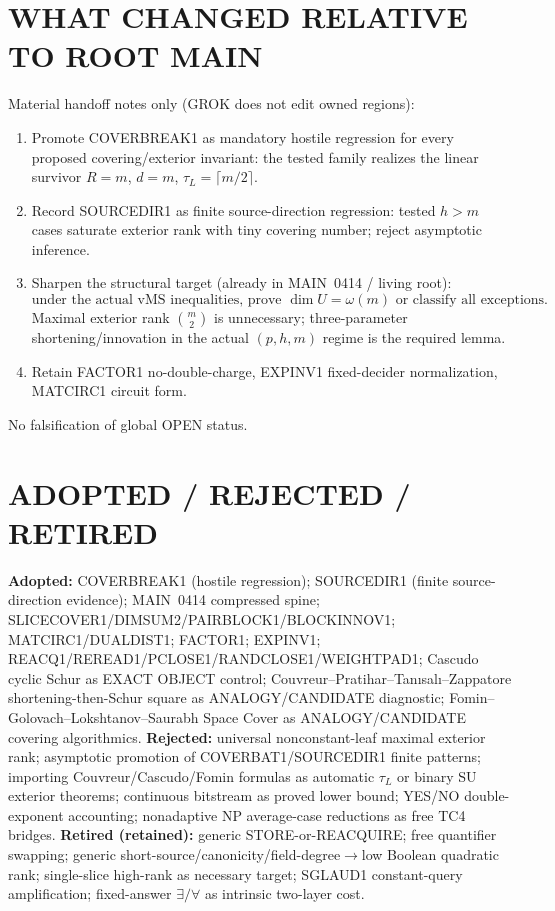 \documentclass[11pt]{article}
\begin{document}
\section*{WHAT CHANGED RELATIVE TO ROOT MAIN}
Material handoff notes only (GROK does not edit owned regions):
\begin{enumerate}
\item Promote COVERBREAK1 as mandatory hostile regression for every proposed covering/exterior
invariant: the tested family realizes the linear survivor $R=m$, $d=m$, $\tau_L=\lceil m/2\rceil$.
\item Record SOURCEDIR1 as finite source-direction regression: tested $h>m$ cases saturate
exterior rank with tiny covering number; reject asymptotic inference.
\item Sharpen the structural target (already in MAIN~0414 / living root):
\[
\boxed{\text{under the actual vMS inequalities, prove }\dim U=\omega(m)\text{ or classify all exceptions}.}
\]
Maximal exterior rank $\binom{m}{2}$ is unnecessary; three-parameter shortening/innovation in the
actual $(p,h,m)$ regime is the required lemma.
\item Retain FACTOR1 no-double-charge, EXPINV1 fixed-decider normalization, MATCIRC1 circuit form.
\end{enumerate}
No falsification of global OPEN status.

\section*{ADOPTED / REJECTED / RETIRED}
\textbf{Adopted:} COVERBREAK1 (hostile regression); SOURCEDIR1 (finite source-direction evidence);
MAIN~0414 compressed spine; SLICECOVER1/DIMSUM2/PAIRBLOCK1/BLOCKINNOV1; MATCIRC1/DUALDIST1;
FACTOR1; EXPINV1; REACQ1/REREAD1/PCLOSE1/RANDCLOSE1/WEIGHTPAD1; Cascudo cyclic Schur as EXACT
OBJECT control; Couvreur--Pratihar--Tan{\i}sal{\i}--Zappatore shortening-then-Schur square as
ANALOGY/CANDIDATE diagnostic; Fomin--Golovach--Lokshtanov--Saurabh Space Cover as
ANALOGY/CANDIDATE covering algorithmics.
\textbf{Rejected:} universal nonconstant-leaf maximal exterior rank; asymptotic promotion of
COVERBAT1/SOURCEDIR1 finite patterns; importing Couvreur/Cascudo/Fomin formulas as automatic
$\tau_L$ or binary SU exterior theorems; continuous bitstream as proved lower bound;
YES/NO double-exponent accounting; nonadaptive NP average-case reductions as free TC4 bridges.
\textbf{Retired (retained):} generic STORE-or-REACQUIRE; free quantifier swapping; generic
short-source/canonicity/field-degree$\to$low Boolean quadratic rank; single-slice high-rank as
necessary target; SGLAUD1 constant-query amplification; fixed-answer $\exists/\forall$ as
intrinsic two-layer cost.
\end{document}
